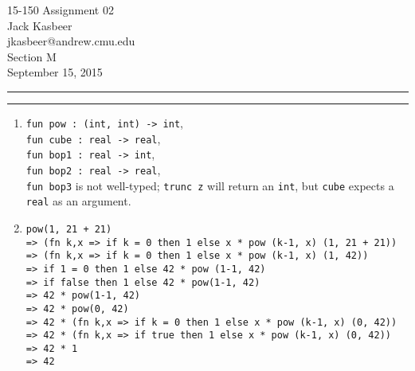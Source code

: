 \documentclass[11pt]{article}
\makeatletter
\newcommand{\question}[2] {\vspace{.25in} \hrule\vspace{0.5em}
\noindent{\bf #1: #2} \vspace{0.5em}
\hrule \vspace{.10in}}
\newcommand{\myname}{Jack Kasbeer}
\newcommand{\myandrew}{jkasbeer@andrew.cmu.edu}
\newcommand{\myhwnum}{02}
\makeatother
\begin{document}
\medskip        

\thispagestyle{plain}
\begin{center}  
{\Large 15-150 Assignment \myhwnum} \\
\myname \\
\myandrew \\
Section M \\
September 15, 2015 \\
\end{center}

\question{2}{Basics}
\begin{enumerate}
\item \verb|fun pow : (int, int) -> int|,\\ 
    \verb|fun cube : real -> real|,\\ 
    \verb|fun bop1 : real -> int|,\\ 
    \verb|fun bop2 : real -> real|,\\
    \verb|fun bop3| is not well-typed; \verb|trunc z| will return an \verb|int|, but \verb|cube| expects a \verb|real| as an argument.
\item \verb|pow(1, 21 + 21)| \\
    \verb|=> (fn k,x => if k = 0 then 1 else x * pow (k-1, x) (1, 21 + 21))|\\
    \verb|=> (fn k,x => if k = 0 then 1 else x * pow (k-1, x) (1, 42))|\\
    \verb|=> if 1 = 0 then 1 else 42 * pow (1-1, 42)|\\
    \verb|=> if false then 1 else 42 * pow(1-1, 42)|\\
    \verb|=> 42 * pow(1-1, 42)|\\
    \verb|=> 42 * pow(0, 42)|\\
    \verb|=> 42 * (fn k,x => if k = 0 then 1 else x * pow (k-1, x) (0, 42))|\\
    \verb|=> 42 * (fn k,x => if true then 1 else x * pow (k-1, x) (0, 42))|\\
    \verb|=> 42 * 1|\\
    \verb|=> 42|
\end{enumerate}
\end{document}
